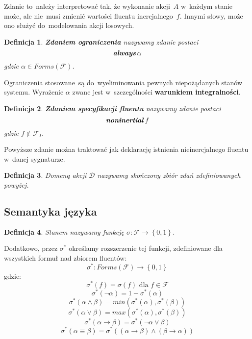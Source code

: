 \documentclass[11pt,a4paper]{article}
\newtheorem{defn}{Definicja}
\DeclareMathOperator{\Always}{\textbf{\textit{always}}}
\DeclareMathOperator{\Noninertial}{\textbf{\textit{noninertial}}}
\begin{document}
Zdanie to~należy interpretować tak, że wykonanie akcji~$A$ w~każdym stanie może, ale nie~musi zmienić wartości fluentu inercjalnego~$f$.
Innymi słowy, może ono służyć do~modelowania akcji losowych.

\begin{defn}
    \textbf{Zdaniem ograniczenia} nazywamy zdanie postaci
    $$ \Always \alpha $$
    gdzie $\alpha \in Forms(\mathcal{F})$.
\end{defn}

Ograniczenia stosowane~są do~wyeliminowania pewnych niepożądanych stanów systemu.
Wyrażenie $\alpha$ zwane jest w~szczególności \textbf{warunkiem integralności}.

\begin{defn}
    \textbf{Zdaniem specyfikacji fluentu} nazywamy zdanie postaci
    $$ \Noninertial f $$
    gdzie $f \notin \mathcal{F}_I$. 
\end{defn}

Powyższe zdanie można traktować jak deklarację istnienia nieinercjalnego fluentu w~danej sygnaturze.

\begin{defn}
    Domeną akcji $\mathcal{D}$ nazywamy skończony zbiór zdań zdefiniowanych powyżej.
\end{defn}

\subsection{Semantyka języka}

\begin{defn}
Stanem nazywamy funkcję $\sigma : \mathcal{F} \rightarrow \left\{0,1\right\}$.
\end{defn}
Dodatkowo, przez $\sigma^{*}$ określamy rozszerzenie tej funkcji, zdefiniowane dla wszystkich formuł nad zbiorem fluentów:
$$\sigma^{*} : Forms(\mathcal{F}) \rightarrow \left\{0,1\right\}$$
gdzie:
$$\sigma^{*}\left(f\right) = \sigma\left(f\right) \text{ dla } f \in \mathcal{F}$$
$$\sigma^{*}\left(\neg \alpha\right) = 1 - \sigma^{*}\left(\alpha\right)$$
$$\sigma^{*}\left(\alpha \land \beta\right) = min\left(\sigma^{*}\left(\alpha\right),\sigma^{*}\left(\beta\right)\right)$$
$$\sigma^{*}\left(\alpha \lor \beta\right) = max\left(\sigma^{*}\left(\alpha\right),\sigma^{*}\left(\beta\right)\right)$$
$$\sigma^{*}\left(\alpha \rightarrow \beta\right) = \sigma^{*}\left(\neg \alpha \lor \beta\right)$$
$$\sigma^{*}\left(\alpha \equiv \beta\right) = \sigma^{*}\left(\left(\alpha \rightarrow \beta\right)\land\left(\beta \rightarrow \alpha\right)\right)$$
\end{document}
